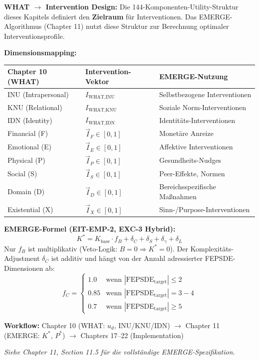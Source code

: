 \begin{tcolorbox}[
    colback=blue!5!white,
    colframe=blue!75!black,
    title={\textbf{Cross-Reference: EMERGE Algorithm (Chapter 11, EIT-EMP)}},
    fonttitle=\bfseries
]
\textbf{WHAT $\rightarrow$ Intervention Design:} Die 144-Komponenten-Utility-Struktur dieses Kapitels definiert den \textbf{Zielraum} für Interventionen. Das EMERGE-Algorithmus (Chapter 11) nutzt diese Struktur zur Berechnung optimaler Interventionsprofile.

\medskip
\textbf{Dimensionsmapping:}
\begin{center}
\begin{tabular}{lll}
\textbf{Chapter 10 (WHAT)} & \textbf{Intervention-Vektor} & \textbf{EMERGE-Nutzung} \\
\midrule
INU (Intrapersonal) & $I_{\text{WHAT},\text{INU}}$ & Selbstbezogene Interventionen \\
KNU (Relational) & $I_{\text{WHAT},\text{KNU}}$ & Soziale Norm-Interventionen \\
IDN (Identity) & $I_{\text{WHAT},\text{IDN}}$ & Identitäts-Interventionen \\
\midrule
Financial (F) & $\vec{I}_F \in [0,1]$ & Monetäre Anreize \\
Emotional (E) & $\vec{I}_E \in [0,1]$ & Affektive Interventionen \\
Physical (P) & $\vec{I}_P \in [0,1]$ & Gesundheits-Nudges \\
Social (S) & $\vec{I}_S \in [0,1]$ & Peer-Effekte, Normen \\
Domain (D) & $\vec{I}_D \in [0,1]$ & Bereichsspezifische Maßnahmen \\
Existential (X) & $\vec{I}_X \in [0,1]$ & Sinn-/Purpose-Interventionen \\
\end{tabular}
\end{center}

\medskip
\textbf{EMERGE-Formel (EIT-EMP-2, EXC-3 Hybrid):}
\[
K^* = K_{\text{base}} \cdot f_B + \delta_C + \delta_S + \delta_\gamma + \delta_L
\]
Nur $f_B$ ist multiplikativ (Veto-Logik: $B=0 \Rightarrow K^*=0$). Der Komplexitäts-Adjustment $\delta_C$ ist additiv und hängt von der Anzahl adressierter FEPSDE-Dimensionen ab:
\[
f_C = \begin{cases}
1.0 & \text{wenn } |\text{FEPSDE}_{\text{target}}| \leq 2 \\
0.85 & \text{wenn } |\text{FEPSDE}_{\text{target}}| = 3-4 \\
0.7 & \text{wenn } |\text{FEPSDE}_{\text{target}}| \geq 5
\end{cases}
\]

\medskip
\textbf{Workflow:} Chapter 10 (WHAT: $u_d$, INU/KNU/IDN) $\rightarrow$ Chapter 11 (EMERGE: $K^*$, $P^*$) $\rightarrow$ Chapters 17--22 (Implementation)

\medskip
\textit{Siehe Chapter 11, Section 11.5 für die vollständige EMERGE-Spezifikation.}
\end{tcolorbox}


